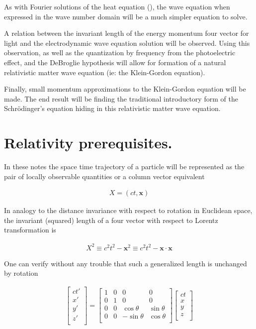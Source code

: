 \documentclass[]{eliblog}
\newcommand{\Bx}[0]{\mathbf{x}}
\begin{document}
As with Fourier solutions of the heat equation (\cite{osgoodFourier}), the wave equation when expressed in the wave number domain will be a much simpler equation to solve. 

A relation between the invariant length of the energy momentum four vector for light and the electrodynamic wave equation solution will be observed.  Using this observation, as well as the quantization by frequency from the photoelectric effect, and the DeBroglie hypothesis will allow for formation of a natural relativistic matter wave equation (ie: the Klein-Gordon equation).

Finally, small momentum approximations to the Klein-Gordon equation will be made.  The end result will be finding the traditional introductory form of the Schr\"{o}dinger's equation hiding in this relativistic matter wave equation.

\section{Relativity prerequisites.}

In these notes the space time trajectory of a particle will be represented as the pair of locally observable quantities or a column vector equivalent

\begin{align}
X = (ct, \Bx)
\end{align}

In analogy to the distance invariance with respect to rotation in Euclidean space, the 
invariant (squared) length of a four vector with respect to Lorentz transformation is

\begin{align}
X^2 \equiv c^2 t^2 - \Bx^2 \equiv c^2 t^2 - \Bx \cdot \Bx
\end{align}

One can verify without any trouble that such a generalized length is unchanged by rotation

\begin{align}
\begin{bmatrix}
ct' \\
x' \\
y' \\
z' \\
\end{bmatrix}
=
\begin{bmatrix}
1 & 0 & 0 & 0 \\
0 & 1 & 0 & 0 \\
0 & 0 & \cos\theta & \sin\theta \\
0 & 0 & -\sin\theta & \cos\theta \\
\end{bmatrix}
\begin{bmatrix}
ct \\
x \\
y \\
z \\
\end{bmatrix}
\end{align}
\end{document}
